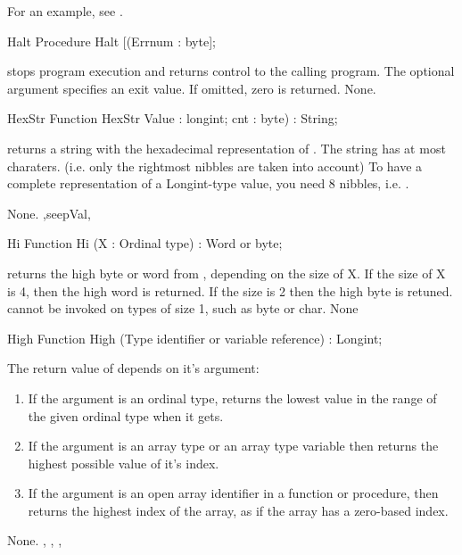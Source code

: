 \documentclass{report}
\begin{document}
For an example, see .
\begin{procedure}{Halt}
\Declaration
Procedure Halt [(Errnum : byte];

\Description
{} stops program execution and returns control to the calling
program. The optional argument  specifies an exit value. If
omitted, zero is returned.
\Errors
None.
\SeeAlso
{}
\end{procedure}
\html{}
\begin{function}{HexStr}
\Declaration
Function HexStr Value : longint; cnt : byte) : String;

\Description
{} returns a string with the hexadecimal representation
of . The string has at most  charaters.
 (i.e. only the  rightmost nibbles are taken into account)
To have a complete representation of a Longint-type value, you need 8
nibbles, i.e. .

\Errors
None.
\SeeAlso
{},seep{Val},
\end{function}
\html{}
\begin{function}{Hi}
\Declaration
Function Hi (X : Ordinal type) : Word or byte;

\Description
{} returns the high byte or word from , depending on the size
of X. If the size of X is 4, then the high word is returned. If the size is
2 then the high byte is retuned.
 cannot be invoked on types of size 1, such as byte or char.
\Errors
None
\SeeAlso
{}
\end{function}
\html{}
\begin{function}{High}
\Declaration
Function High (Type identifier or variable reference) : Longint;

\Description
 The return value of  depends on it's argument:
\begin{enumerate}
\item If the argument is an ordinal type,  returns the lowest value in the range of the given ordinal
type when it gets.
\item If the argument is an array type or an array type variable then
 returns the highest possible value of it's index.
\item If the argument is an open array identifier in a function or
procedure, then  returns the highest index of the array, as if the
array has a zero-based index.
\end{enumerate}

\Errors
None.
\SeeAlso
{}, , , 
\end{function}
\end{document}
